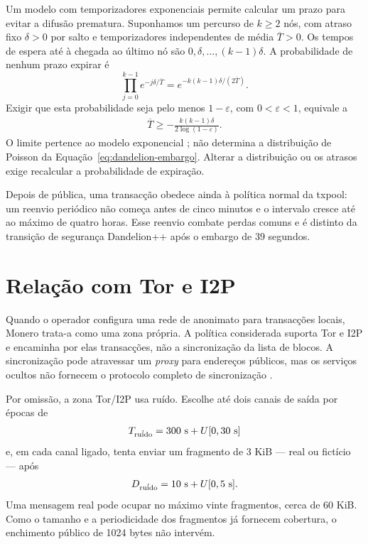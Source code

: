 Um modelo com temporizadores exponenciais permite calcular um prazo para
evitar a difusão prematura. Suponhamos um percurso de \(k\geq2\) nós,
com atraso fixo \(\delta>0\) por salto e temporizadores independentes de média
\(\overline T>0\). Os tempos de espera até à chegada ao último nó são
\(0,\delta,\ldots,(k-1)\delta\). A
probabilidade de nenhum prazo expirar é
\[
 \prod_{j=0}^{k-1}e^{-j\delta/\overline T}
   =e^{-k(k-1)\delta/(2\overline T)}.
\]
Exigir que esta probabilidade seja pelo menos \(1-\varepsilon\), com
\(0<\varepsilon<1\), equivale a
\begin{align}
 \overline T\geq-\frac{k(k-1)\delta}{2\log(1-\varepsilon)}.
 \label{eq:dandelion-embargo-design}
\end{align}
O limite pertence ao modelo exponencial \cite{dandelion-plus-plus}; não
determina a distribuição de Poisson da
Equação~\eqref{eq:dandelion-embargo}. Alterar a distribuição ou os atrasos
exige recalcular a probabilidade de expiração.

Depois de pública, uma transacção obedece ainda à política normal da txpool:
um reenvio periódico não começa antes de cinco minutos e o intervalo cresce
até ao máximo de quatro horas. Esse reenvio combate perdas comuns e é distinto
da transição de segurança Dandelion++ após o embargo de 39 segundos.




\section{Relação com Tor e I2P}
\label{sec:dandelion-anonymity-networks}

Quando o operador configura uma rede de anonimato para transacções locais,
Monero trata-a como uma zona própria. A política considerada suporta Tor e I2P
e encaminha por elas transacções, não a sincronização da lista de blocos. A
sincronização pode atravessar um \emph{proxy} para endereços públicos, mas os
serviços ocultos não fornecem o protocolo completo de sincronização
\cite{monero-source-v16}.

Por omissão, a zona Tor/I2P usa ruído. Escolhe até dois canais de saída por
épocas de
\begin{align}
 T_{\rm ru\acute ido}=300\ {\rm s}+U[0,30\ {\rm s}]
 \label{eq:dandelion-noise-epoch}
\end{align}
e, em cada canal ligado, tenta enviar um fragmento de 3 KiB --- real ou
fictício --- após
\begin{align}
 D_{\rm ru\acute ido}=10\ {\rm s}+U[0,5\ {\rm s}].
 \label{eq:dandelion-noise-delay}
\end{align}
Uma mensagem real pode ocupar no máximo vinte fragmentos, cerca de 60 KiB.
Como o tamanho e a periodicidade dos fragmentos já fornecem cobertura, o
enchimento público de 1024 bytes não intervém.


